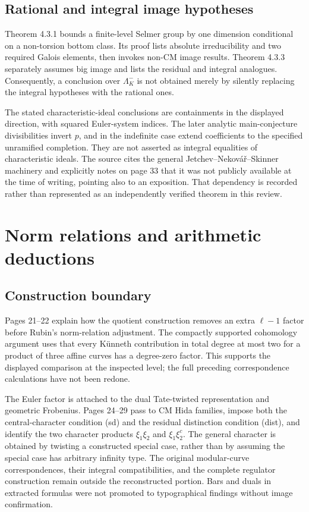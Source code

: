 \documentclass[10pt]{article}
\begin{document}
\subsection*{Rational and integral image hypotheses}
Theorem 4.3.1 bounds a finite-level Selmer group by one dimension conditional on a non-torsion bottom class. Its proof lists absolute irreducibility and two required Galois elements, then invokes non-CM image results. Theorem 4.3.3 separately assumes big image and lists the residual and integral analogues. Consequently, a conclusion over \(\Lambda^-_K\) is not obtained merely by silently replacing the integral hypotheses with the rational ones.\par
The stated characteristic-ideal conclusions are containments in the displayed direction, with squared Euler-system indices. The later analytic main-conjecture divisibilities invert \(p\), and in the indefinite case extend coefficients to the specified unramified completion. They are not asserted as integral equalities of characteristic ideals. The source cites the general Jetchev–Nekovář–Skinner machinery and explicitly notes on page 33 that it was not publicly available at the time of writing, pointing also to an exposition. That dependency is recorded rather than represented as an independently verified theorem in this review.\par
\section*{Norm relations and arithmetic deductions}
\subsection*{Construction boundary}
Pages 21–22 explain how the quotient construction removes an extra \(\ell-1\) factor before Rubin’s norm-relation adjustment. The compactly supported cohomology argument uses that every Künneth contribution in total degree at most two for a product of three affine curves has a degree-zero factor. This supports the displayed comparison at the inspected level; the full preceding correspondence calculations have not been redone.\par
The Euler factor is attached to the dual Tate-twisted representation and geometric Frobenius. Pages 24–29 pass to CM Hida families, impose both the central-character condition (sd) and the residual distinction condition (dist), and identify the two character products \(\xi_1\xi_2\) and \(\xi_1\xi_2^c\). The general character is obtained by twisting a constructed special case, rather than by assuming the special case has arbitrary infinity type. The original modular-curve correspondences, their integral compatibilities, and the complete regulator construction remain outside the reconstructed portion. Bars and duals in extracted formulas were not promoted to typographical findings without image confirmation.\par
\end{document}
